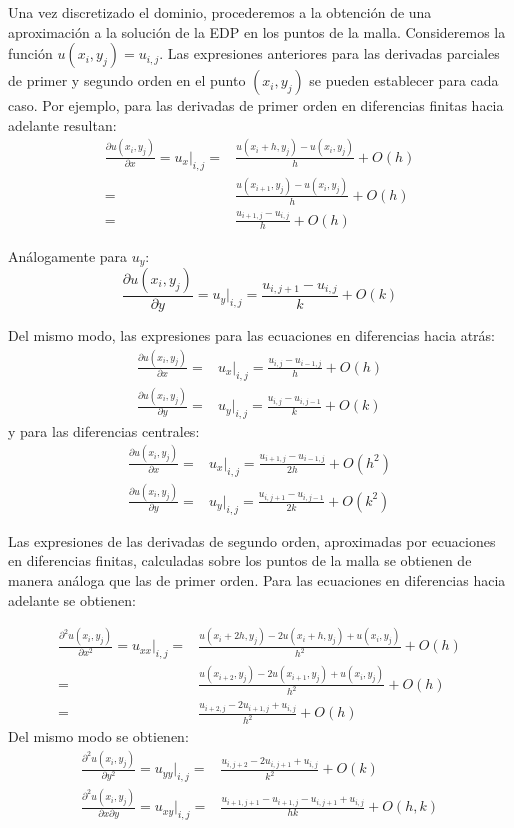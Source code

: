 Una vez discretizado el dominio, procederemos a la obtención de una aproximación a la solución de la EDP en los puntos de la malla. Consideremos la función $u(x_i, y_j) =u_{i,j}$. Las expresiones anteriores para las derivadas parciales de primer y segundo orden en el punto $(x_i, y_j)$ se pueden establecer para cada caso. Por ejemplo, para las derivadas de primer orden en diferencias finitas hacia adelante resultan:
\begin{align*} 
 \frac{\partial u(x_i, y_j)}{\partial x} = u_x \Bigr|_{i,j} =& \frac{u(x_i + h, y_j) - u(x_i, y_j)}{h} + O(h) \\
                  =& \frac{u(x_{i+1}, y_j) - u(x_i, y_j)}{h} + O(h) \\
                  =& \frac{u_{i+1, j} - u_{i,j}}{h} + O(h)
\end{align*}

Análogamente para $u_y$:
\begin{equation*}
 \frac{\partial u(x_i, y_j)}{\partial y} = u_y \Bigr|_{i,j} = \frac{u_{i, j+1} - u_{i,j}}{k} + O(k)
\end{equation*} 

Del mismo modo, las expresiones para las ecuaciones en diferencias hacia atrás:
\begin{align*}
 \frac{\partial u(x_i, y_j)}{\partial x} =& u_x \Bigr|_{i,j} = \frac{u_{i, j} - u_{i-1,j}}{h} + O(h) \\
 \frac{\partial u(x_i, y_j)}{\partial y} =& u_y \Bigr|_{i,j} = \frac{u_{i, j} - u_{i,j-1}}{k} + O(k)
\end{align*}
y para las diferencias centrales:
\begin{align*}
 \frac{\partial u(x_i, y_j)}{\partial x} =& u_x \Bigr|_{i,j} = \frac{u_{i+1, j} - u_{i-1,j}}{2h} + O(h^2) \\
 \frac{\partial u(x_i, y_j)}{\partial y} =& u_y \Bigr|_{i,j} = \frac{u_{i, j+1} - u_{i,j-1}}{2k} + O(k^2)
\end{align*}

Las expresiones de las derivadas de segundo orden, aproximadas por ecuaciones en diferencias finitas, calculadas sobre los puntos de la malla se obtienen de manera análoga que las de primer orden. Para las ecuaciones en diferencias hacia adelante se obtienen:

\begin{align*}
 \frac{\partial^2 u(x_i, y_j)}{\partial x^2} = u_{xx} \Bigr|_{i,j} =& \frac{u(x_i+2h,y_j) - 2u(x_i+h, y_j) + u(x_i, y_j)}{h^2} + O(h) \\
 =& \frac{u(x_{i+2}, y_j)-2u(x_{i+1},y_j)+u(x_i, y_j)}{h^2} + O(h) \\
 =& \frac{u_{i+2,j}-2u_{i+1,j}+u_{i,j}}{h^2} + O(h)
\end{align*}
Del mismo modo se obtienen:
\begin{align*}
 \frac{\partial^2u(x_i, y_j)}{\partial y^2} = u_{yy} \Bigr|_{i,j} =& \frac{u_{i,j+2}-2u_{i, j+1}+u_{i,j}}{k^2} + O(k) \\
 \frac{\partial^2u(x_i, y_j)}{\partial x \partial y} = u_{xy} \Bigr|_{i,j} =& \frac{u_{i+1, j+1} - u_{i+1, j} - u_{i, j+1} + u_{i,j}}{hk} + O(h,k)
\end{align*}

